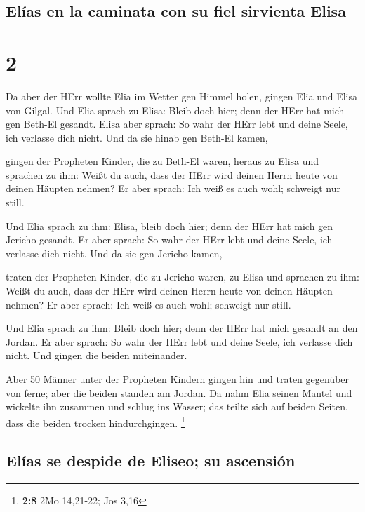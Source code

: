\hypertarget{eluxedas-en-la-caminata-con-su-fiel-sirvienta-elisa}{%
\subsection{Elías en la caminata con su fiel sirvienta
Elisa}\label{eluxedas-en-la-caminata-con-su-fiel-sirvienta-elisa}}

\hypertarget{section-1}{%
\section{2}\label{section-1}}

 Da aber der HErr wollte Elia im Wetter gen Himmel holen,
gingen Elia und Elisa von Gilgal.  Und Elia sprach zu
Elisa: Bleib doch hier; denn der HErr hat mich gen Beth-El gesandt.
Elisa aber sprach: So wahr der HErr lebt und deine Seele, ich verlasse
dich nicht. Und da sie hinab gen Beth-El kamen,

 gingen der Propheten Kinder, die zu Beth-El waren, heraus
zu Elisa und sprachen zu ihm: Weißt du auch, dass der HErr wird deinen
Herrn heute von deinen Häupten nehmen? Er aber sprach: Ich weiß es auch
wohl; schweigt nur still.

 Und Elia sprach zu ihm: Elisa, bleib doch hier; denn der
HErr hat mich gen Jericho gesandt. Er aber sprach: So wahr der HErr lebt
und deine Seele, ich verlasse dich nicht. Und da sie gen Jericho kamen,

 traten der Propheten Kinder, die zu Jericho waren, zu
Elisa und sprachen zu ihm: Weißt du auch, dass der HErr wird deinen
Herrn heute von deinen Häupten nehmen? Er aber sprach: Ich weiß es auch
wohl; schweigt nur still.

 Und Elia sprach zu ihm: Bleib doch hier; denn der HErr
hat mich gesandt an den Jordan. Er aber sprach: So wahr der HErr lebt
und deine Seele, ich verlasse dich nicht. Und gingen die beiden
miteinander.

 Aber 50 Männer unter der Propheten Kindern gingen hin und
traten gegenüber von ferne; aber die beiden standen am Jordan.
 Da nahm Elia seinen Mantel und wickelte ihn zusammen und
schlug ins Wasser; das teilte sich auf beiden Seiten, dass die beiden
trocken hindurchgingen. \footnote{\textbf{2:8} 2Mo 14,21-22; Jos 3,16}

\hypertarget{eluxedas-se-despide-de-eliseo-su-ascensiuxf3n}{%
\subsection{Elías se despide de Eliseo; su
ascensión}\label{eluxedas-se-despide-de-eliseo-su-ascensiuxf3n}}


